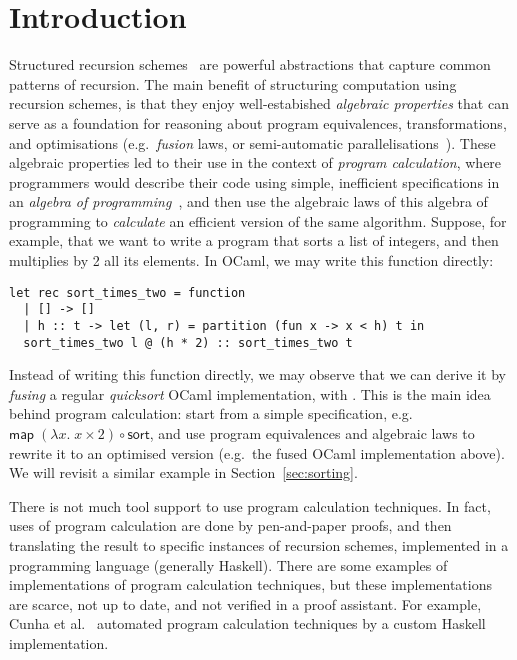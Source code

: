 \documentclass[a4paper,anonymous, UKenglish,cleveref, autoref, thm-restate]{lipics-v2021}
\begin{document}
\section{Introduction}
\label{sec:intro}
Structured recursion schemes~\cite{HinzeW16,HinzeWG15} are powerful
abstractions that capture common patterns of recursion. The main benefit of
structuring computation using recursion schemes, is that they enjoy
well-estabished \emph{algebraic properties} that can serve as a foundation for
reasoning about program equivalences, transformations, and
optimisations (e.g.\ \emph{fusion} laws, or semi-automatic
parallelisations~\cite{TakanoM95,Gibbons96:Third,Morihata09:Third,farmsCastro}).
These algebraic properties led to their use in the context of
\emph{program calculation}, where programmers would describe their code using
simple, inefficient specifications in an \emph{algebra of
programming}~\cite{BirddeMoor96:Algebra}, and then use the algebraic laws of
this algebra of programming to \emph{calculate} an efficient version of the same
algorithm. Suppose, for example, that we want to write a program that sorts a list of
integers, and then multiplies by 2 all its elements. In OCaml, we may write this
function directly:
\begin{verbatim}
let rec sort_times_two = function
  | [] -> []
  | h :: t -> let (l, r) = partition (fun x -> x < h) t in
  sort_times_two l @ (h * 2) :: sort_times_two t
\end{verbatim}
Instead of writing this function directly, we may observe that we can derive it
by \emph{fusing} a regular \emph{quicksort} OCaml implementation, with
. This is the main idea behind program calculation:
start
from a simple specification, e.g.\
$\mathsf{map}\;(\lambda x.\;x \times 2) \circ \mathsf{sort}$, and use program
equivalences and algebraic laws to rewrite it to an optimised version  (e.g.\
the fused OCaml implementation above). We will revisit a similar example
in Section~\ref{sec:sorting}.

There is not much tool support to use program calculation techniques. In fact,
uses of program calculation are done by  pen-and-paper proofs, and then
translating the result to specific instances of recursion schemes, implemented
in a programming language (generally Haskell).  There are some examples of
implementations of program calculation techniques, but these implementations are
scarce, not up to date, and not verified in a proof assistant. For example,
Cunha et al.~\cite{DrHylo} automated program calculation techniques by a custom
Haskell implementation.
\end{document}

